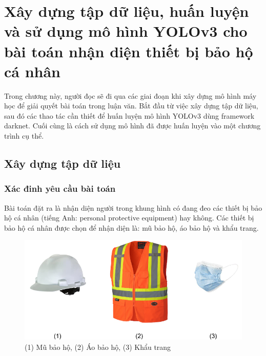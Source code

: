 \chapter{Xây dựng tập dữ liệu, huấn luyện và sử dụng mô hình YOLOv3 cho bài toán nhận diện thiết bị bảo hộ cá nhân}
Trong chương này, người đọc sẽ đi qua các giai đoạn khi xây dựng mô hình máy học để giải quyết bài toán trong luận văn. Bắt đầu từ việc xây dựng tập dữ liệu, sau đó các thao tác cần thiết để huấn luyện mô hình YOLOv3 dùng framework darknet. Cuối cùng là cách sử dụng mô hình đã được huấn luyện vào một chương trình cụ thể.
\section{Xây dựng tập dữ liệu}
\subsection{Xác đinh yêu cầu bài toán}
Bài toán đặt ra là nhận diện người trong khung hình có đang đeo các thiết bị bảo hộ cá nhân (tiếng Anh: personal protective equipment) hay không. Các thiết bị bảo hộ cá nhân được chọn để nhận diện là: mũ bảo hộ, áo bảo hộ và khẩu trang.
\begin{figure}[ht!]
	\centerline{\includegraphics[scale=0.3]{images/ppe.png}}
  	\caption{(1) Mũ bảo hộ, (2) Áo bảo hộ, (3) Khẩu trang}
  	\label{fig:ppe}
\end{figure}


